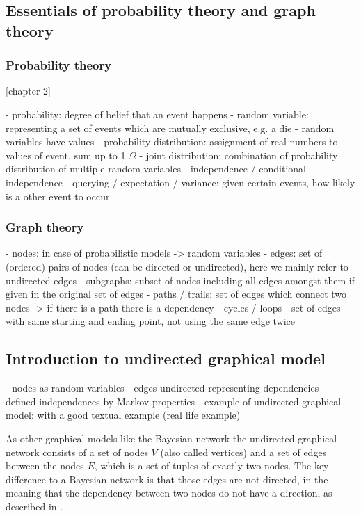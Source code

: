 \subsection{Essentials of probability theory and graph theory}

\subsubsection{Probability theory}
[chapter 2]

- probability: degree of belief that an event happens
- random variable: representing a set of events which are mutually exclusive, e.g. a die
- random variables have values
- probability distribution: assignment of real numbers to values of event, sum up to 1 $\Omega$
- joint distribution: combination of probability distribution of multiple random variables
- independence / conditional independence
- querying / expectation / variance: given certain events, how likely is a other event to occur

\subsubsection{Graph theory}

- nodes: in case of probabilistic models -> random variables
- edges: set of (ordered) pairs of nodes (can be directed or undirected), here we mainly refer to undirected edges
- subgraphs: subset of nodes including all edges amongst them if given in the original set of edges
- paths / trails: set of edges which connect two nodes -> if there is a path there is a dependency
- cycles / loops - set of edges with same starting and ending point, not using the same edge twice

\subsection{Introduction to undirected graphical model}

- nodes as random variables
- edges undirected representing dependencies
- defined independences by Markov properties
- example of undirected graphical model: with a good textual example (real life example)

As other graphical models like the Bayesian network the undirected graphical network consists of a set of nodes $V$ (also called vertices) and a set of edges between the nodes $E$, which is a set of tuples of exactly two nodes. The key difference to a Bayesian network is that those edges are not directed, in the meaning that the dependency between two nodes do not have a direction, as described in \cite{koller2009probabilistic}.

